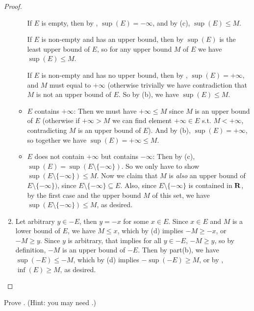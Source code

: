 \begin{proof}
\begin{enumerate}
\begin{itemize}
        If \(E\) is empty, then by , \(\sup(E) = -\infty\), and by (c), \(\sup(E) \le M\).
        
        If \(E\) is non-empty and has an upper bound, then by  \(\sup(E)\) is the least upper bound of \(E\), so for any upper bound \(M\) of \(E\) we have \(\sup(E) \le M\).
        
        If \(E\) is non-empty and has no upper bound, then by , \(\sup(E) = +\infty\), and \(M\) must equal to \(+\infty\) (otherwise trivially we have contradiction that \(M\) is not an upper bound of \(E\).
        So by (b), we have \(\sup(E) \le M\).
    \item \(E\) contains \(+\infty\):
        Then we must have \(+\infty \le M\) since \(M\) is an upper bound of \(E\) (otherwise if \(+\infty > M\) we can find element \(+\infty \in E\) s.t. \(M < +\infty\), contradicting \(M\) is an upper bound of \(E\)).
        And by (b), \(\sup(E) = +\infty\), so together we have \(\sup(E) = +\infty \le M\).
    \item \(E\) does not contain \(+\infty\) but contains \(-\infty\):
        Then by (c), \(\sup(E) = \sup(E \setminus \{-\infty\})\).
        So we only have to show \(\sup(E \setminus \{-\infty\}) \le M\).
        Now we claim that \(M\) is \emph{also} an upper bound of \(E \setminus \{-\infty\})\), since \(E \setminus \{-\infty\} \subseteq E\).
        Also, since \(E \setminus \{-\infty\}\) is contained in \(\mathbf{R}\), by the first case and the upper bound \(M\) of this set, we have \(\sup(E \setminus \{-\infty\}) \le M\), as desired.
    \end{itemize}
\item
    Let arbitrary \(y \in -E\), then \(y = -x\) for some \(x \in E\).
    Since \(x \in E\) and \(M\) is a lower bound of \(E\), we have \(M \le x\), which by (d) implies \(-M \ge -x\), or \(-M \ge y\).
    Since \(y\) is arbitrary, that implies for all \(y \in -E\), \(-M \ge y\), so by definition, \(-M\) is an upper bound of \(-E\).
    Then by part(b), we have \(\sup(-E) \le -M\), which by (d) implies \(-\sup(-E) \ge M\), or by , \(\inf(E) \ge M\), as desired.
\end{enumerate}
\end{proof}

\exercisesection

\begin{exercise} \label{exercise 6.2.1}
Prove .
(Hint: you may need .)
\end{exercise}

